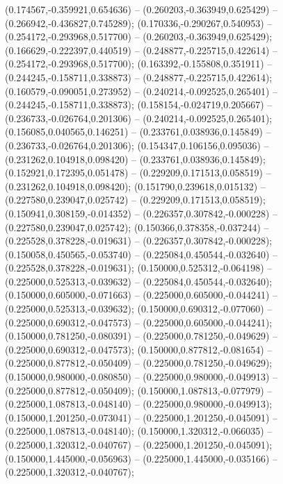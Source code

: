  (0.174567,-0.359921,0.654636) -- (0.260203,-0.363949,0.625429) -- (0.266942,-0.436827,0.745289);
 (0.170336,-0.290267,0.540953) -- (0.254172,-0.293968,0.517700) -- (0.260203,-0.363949,0.625429);
 (0.166629,-0.222397,0.440519) -- (0.248877,-0.225715,0.422614) -- (0.254172,-0.293968,0.517700);
 (0.163392,-0.155808,0.351911) -- (0.244245,-0.158711,0.338873) -- (0.248877,-0.225715,0.422614);
 (0.160579,-0.090051,0.273952) -- (0.240214,-0.092525,0.265401) -- (0.244245,-0.158711,0.338873);
 (0.158154,-0.024719,0.205667) -- (0.236733,-0.026764,0.201306) -- (0.240214,-0.092525,0.265401);
 (0.156085,0.040565,0.146251) -- (0.233761,0.038936,0.145849) -- (0.236733,-0.026764,0.201306);
 (0.154347,0.106156,0.095036) -- (0.231262,0.104918,0.098420) -- (0.233761,0.038936,0.145849);
 (0.152921,0.172395,0.051478) -- (0.229209,0.171513,0.058519) -- (0.231262,0.104918,0.098420);
 (0.151790,0.239618,0.015132) -- (0.227580,0.239047,0.025742) -- (0.229209,0.171513,0.058519);
 (0.150941,0.308159,-0.014352) -- (0.226357,0.307842,-0.000228) -- (0.227580,0.239047,0.025742);
 (0.150366,0.378358,-0.037244) -- (0.225528,0.378228,-0.019631) -- (0.226357,0.307842,-0.000228);
 (0.150058,0.450565,-0.053740) -- (0.225084,0.450544,-0.032640) -- (0.225528,0.378228,-0.019631);
 (0.150000,0.525312,-0.064198) -- (0.225000,0.525313,-0.039632) -- (0.225084,0.450544,-0.032640);
 (0.150000,0.605000,-0.071663) -- (0.225000,0.605000,-0.044241) -- (0.225000,0.525313,-0.039632);
 (0.150000,0.690312,-0.077060) -- (0.225000,0.690312,-0.047573) -- (0.225000,0.605000,-0.044241);
 (0.150000,0.781250,-0.080391) -- (0.225000,0.781250,-0.049629) -- (0.225000,0.690312,-0.047573);
 (0.150000,0.877812,-0.081654) -- (0.225000,0.877812,-0.050409) -- (0.225000,0.781250,-0.049629);
 (0.150000,0.980000,-0.080850) -- (0.225000,0.980000,-0.049913) -- (0.225000,0.877812,-0.050409);
 (0.150000,1.087813,-0.077979) -- (0.225000,1.087813,-0.048140) -- (0.225000,0.980000,-0.049913);
 (0.150000,1.201250,-0.073041) -- (0.225000,1.201250,-0.045091) -- (0.225000,1.087813,-0.048140);
 (0.150000,1.320312,-0.066035) -- (0.225000,1.320312,-0.040767) -- (0.225000,1.201250,-0.045091);
 (0.150000,1.445000,-0.056963) -- (0.225000,1.445000,-0.035166) -- (0.225000,1.320312,-0.040767);
